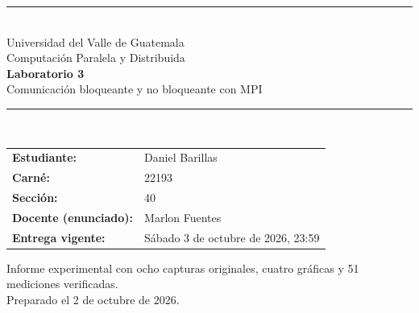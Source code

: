 \documentclass[11pt,letterpaper]{article}
\begin{document}
\thispagestyle{empty}
\vspace*{2.4cm}
{\color{azul}\rule{\linewidth}{1.8pt}}\\[1.1cm]
{\Large Universidad del Valle de Guatemala}\\[0.4cm]
{\large Computación Paralela y Distribuida}\\[2.2cm]
{\Huge\bfseries\color{azul} Laboratorio 3}\\[0.35cm]
{\Large Comunicación bloqueante y no bloqueante con MPI}\\[0.8cm]
{\color{azul}\rule{0.62\linewidth}{0.8pt}}\\[2.0cm]
\begin{tabular}{@{}ll@{}}
\textbf{Estudiante:} & Daniel Barillas \\
\textbf{Carné:} & 22193 \\
\textbf{Sección:} & 40 \\
\textbf{Docente (enunciado):} & Marlon Fuentes \\
\textbf{Entrega vigente:} & Sábado 3 de octubre de 2026, 23:59 \\
\end{tabular}
\vfill
{\small\color{gris}Informe experimental con ocho capturas originales,
cuatro gráficas y 51 mediciones verificadas.\\
Preparado el 2 de octubre de 2026.}
\newpage

\begin{abstract}
Este informe documenta el diseño de cuatro programas de comunicación
punto a punto con MPI. Los dos primeros emplean llamadas bloqueantes para
resolver un intercambio Ping-Pong y un anillo con un único token. Los dos
restantes estudian comunicación no bloqueante mediante una recepción
anticipada con trabajo aritmético y un productor-consumidor que transfiere
un arreglo por chunks. Se define un protocolo reproducible de medición con
\texttt{MPI\_Wtime}, validación de datos y repeticiones por configuración.
Se analizan 51 ejecuciones realizadas por el estudiante en WSL: tres
repeticiones de cada una de 17 configuraciones. El RTT mediano de Ping-Pong
aumenta de 0.495 a 50.171 microsegundos entre los mensajes mínimo y máximo.
El anillo con llamadas separadas registra 2.242 ms, frente a 3.290 ms con
Sendrecv; esta diferencia se interpreta considerando el tráfico adicional
de centinelas. La recepción anticipada realiza cálculo antes de confirmar
la llegada del mensaje, sin medir una aceleración frente a una referencia
bloqueante. El pipeline obtiene su menor tiempo mediano, 2.279 ms, con
chunks de 65\,536 enteros. Se conservan todas las observaciones y se limita
la interpretación al entorno y a los tamaños ensayados.
\end{abstract}
\end{document}
